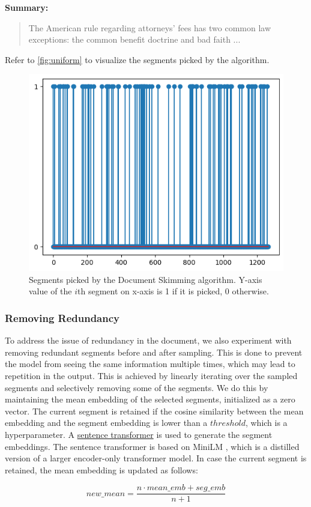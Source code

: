 \noindent \textbf{Summary:}
\begin{quote}
  The American rule regarding attorneys' fees has two common law exceptions: the common benefit doctrine and bad faith ...
\end{quote}

Refer to \autoref{fig:uniform} to visualize the segments picked by the algorithm.

\begin{figure}
  \centering
  \includegraphics*[width=.45\textwidth]{images/uniform.png}
  \caption{
    Segments picked by the Document Skimming algorithm.
    Y-axis value of the $i$th segment on x-axis is 1 if it is picked, 0 otherwise.
  }
  \label{fig:uniform}
\end{figure}

\subsubsection*{Removing Redundancy}

To address the issue of redundancy in the document, we also experiment with removing redundant segments before and after sampling.
This is done to prevent the model from seeing the same information multiple times, which may lead to repetition in the output.
This is achieved by linearly iterating over the sampled segments and selectively removing some of the segments.
We do this by maintaining the mean embedding of the selected segments, initialized as a zero vector.
The current segment is retained if the cosine similarity between the mean embedding and the segment embedding is lower than a $threshold$, which is a hyperparameter.
A \href{https://huggingface.co/sentence-transformers/all-MiniLM-L6-v2}{sentence transformer} is used to generate the segment embeddings.
The sentence transformer is based on MiniLM \cite{wang2020minilm}, which is a distilled version of a larger encoder-only transformer model.
In case the current segment is retained, the mean embedding is updated as follows:

\[ new\_mean = \frac{n \cdot mean\_emb + seg\_emb}{n + 1} \]

